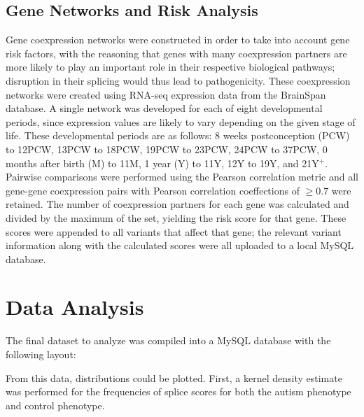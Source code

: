 \documentclass[12pt]{article}
\begin{document}
\subsection{Gene Networks and Risk Analysis}
Gene coexpression networks were constructed in order to take into account
gene risk factors, with the reasoning that genes with many coexpression 
partners are more likely to play an important role in their respective 
biological pathways; disruption in their splicing would thus lead to 
pathogenicity. These coexpression networks were created using RNA-seq 
expression data from the BrainSpan database. A single network was developed for
each of eight developmental periods, since expression values are likely to
vary depending on the given stage of life. These developmental periods are as
follows: 8 weeks postconception (PCW) to 12PCW, 13PCW to 18PCW, 19PCW to 23PCW,
24PCW to 37PCW, 0 months after birth (M) to 11M, 1 year (Y) to 11Y, 12Y to 19Y,
and 21Y$^{+}$. Pairwise comparisons were performed using the Pearson 
correlation metric and all gene-gene coexpression pairs with Pearson
correlation coeffections of $\geq 0.7$ were retained. The number of 
coexpression partners for each gene was calculated and divided by the maximum
of the set, yielding the risk score for that gene. These scores were appended
to all variants that affect that gene; the relevant variant information
along with the calculated scores were all uploaded to a local MySQL database.

\section{Data Analysis}
The final dataset to analyze was compiled into a MySQL database with the 
following layout:


\pagebreak

From this data, distributions could be plotted. First, a kernel density 
estimate was performed for the frequencies of splice scores for both the 
autism phenotype and control phenotype.
\end{document}
